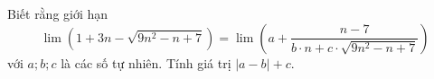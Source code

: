 \begin{ex}
Biết rằng giới hạn \[\lim\left(1+3n-\sqrt{9n^2-n+7}\right)=\lim\left(a+\dfrac{n-7}{b\cdot n+c\cdot\sqrt{9n^2-n+7}}\right)\] với $a;b;c$ là các số tự nhiên. Tính giá trị $|a-b|+c$.
\end{ex}
